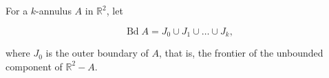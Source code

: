 For a $k$-annulus $A$ in $\mathbb{R}^2$, let

$$\operatorname{Bd} A = J_0 \cup J_1 \cup \ldots \cup J_k,$$

where $J_0$ is the outer boundary of $A$, that is, the frontier of the unbounded component of $\mathbb{R}^2 - A$.
